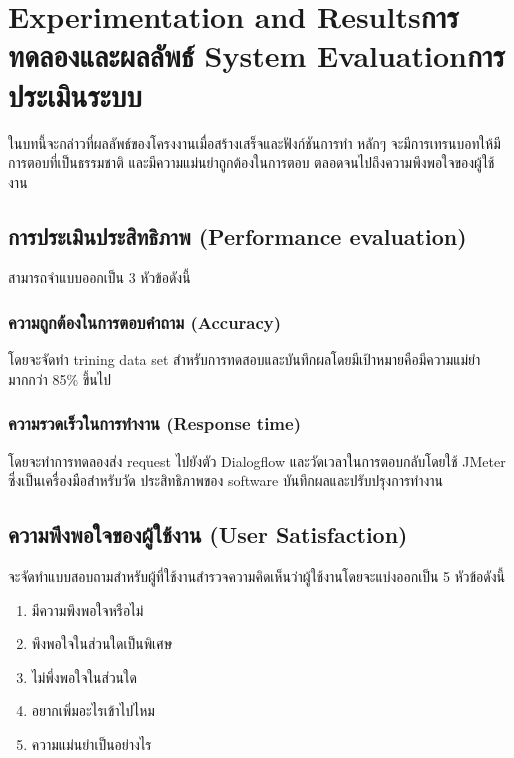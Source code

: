 \chapter{\ifproject%
\ifenglish Experimentation and Results\else การทดลองและผลลัพธ์\fi
\else%
\ifenglish System Evaluation\else การประเมินระบบ\fi
\fi}

ในบทนี้จะกล่าวที่ผลลัพธ์ของโครงงานเมื่อสร้างเสร็จและฟังก์ชันการทำ หลักๆ จะมีการเทรนบอทให้มี
การตอบที่เป็นธรรมชาติ และมีความแม่นยำถูกต้องในการตอบ ตลอดจนไปถึงความพึงพอใจของผู้ใช้งาน
\section{การประเมินประสิทธิภาพ (Performance evaluation)}
สามารถจำแบบออกเป็น 3 หัวข้อดังนี้
\subsection{ความถูกต้องในการตอบคำถาม (Accuracy)} 
โดยจะจัดทำ trining data set สำหรับการทดสอบและบันทึกผลโดยมีเป้าหมายคือมีความแม่ยำมากกว่า 85\% ขึ้นไป

\subsection{ความรวดเร็วในการทำงาน (Response time)}
โดยจะทำการทดลองส่ง request ไปยังตัว Dialogflow และวัดเวลาในการตอบกลับโดยใช้ JMeter ซึ่งเป็นเครื่องมือสำหรับวัด
ประสิทธิภาพของ software บันทึกผลและปรับปรุงการทำงาน

\section{ความพึงพอใจของผู้ใช้งาน (User Satisfaction)}
จะจัดทำแบบสอบถามสำหรับผู้ที่ใช้งานสำรวจความคิดเห็นว่าผู้ใช้งานโดยจะแบ่งออกเป็น 5 หัวข้อดังนี้
\begin{enumerate}
    \item มีความพึงพอใจหรือไม่
    \item พึงพอใจในส่วนใดเป็นพิเศษ
    \item ไม่พึ่งพอใจในส่วนใด
    \item อยากเพิ่มอะไรเข้าไปไหม
    \item ความแม่นยำเป็นอย่างไร 
\end{enumerate}




